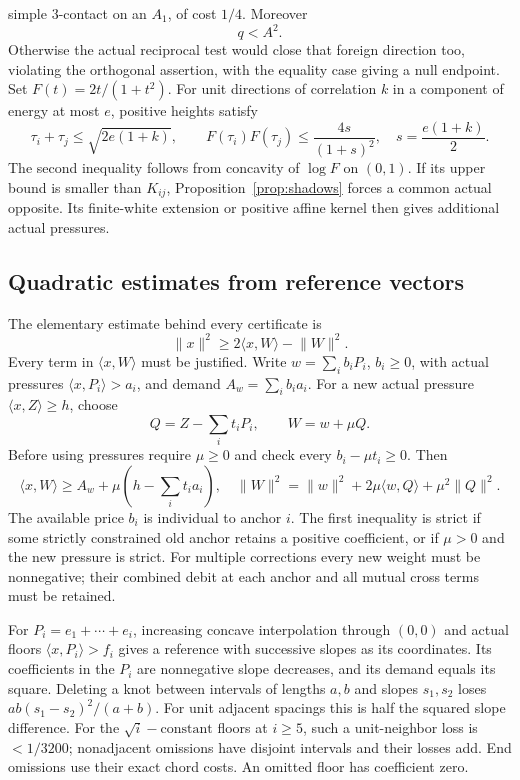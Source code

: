 \documentclass[11pt]{article}
\theoremstyle{remark}\newtheorem{remark}[theorem]{Remark}
\numberwithin{equation}{section}
\newcommand{\ip}[2]{\langle #1,#2\rangle}
\newcommand{\norm}[1]{\lVert #1\rVert}
\begin{document}
simple \(3\)-contact on an \(A_1\), of cost \(1/4\).
Moreover
 \begin{equation}\label{eq:foreigncost}q<A^2.
\end{equation}
Otherwise the actual reciprocal test would close that foreign
direction too, violating the orthogonal assertion, with the
equality case giving a null endpoint.
Set \(F(t)=2t/(1+t^2)\). For unit directions of correlation \(k\)
in a component of energy at most \(e\), positive heights satisfy
 \begin{equation}\label{eq:pairupper}\tau_i+\tau_j\leq\sqrt{2e(1+k)},\qquad
 F(\tau_i)F(\tau_j)\leq\frac{4s}{(1+s)^2},\quad
 s=\frac{e(1+k)}2.
\end{equation}
The second inequality follows from concavity of \(\log F\) on
 \((0,1)\). If its upper bound is smaller than \(K_{ij}\),
Proposition~\ref{prop:shadows} forces a common actual opposite.
Its finite-white extension or positive affine kernel then gives
additional actual pressures.

\subsection{Quadratic estimates from reference vectors}
\label{compact:sec:references}
The elementary estimate behind every certificate is
 \begin{equation}
\label{eq:square}\norm{x}^2\geq2\ip{x}{W}-\norm{W}^2.
\end{equation}
Every term in \(\ip{x}{W}\) must be justified.
Write \(w=\sum_i b_iP_i\), \(b_i\geq0\), with actual pressures
 \(\ip{x}{P_i}>a_i\), and demand \(A_w=\sum_i b_i a_i\).
For a new actual pressure \(\ip{x}{Z}\geq h\), choose
 \[
 Q=Z-\sum_i t_iP_i,\qquad W=w+\mu Q.
\]
Before using pressures require \(\mu\geq0\) and check every
 \(b_i-\mu t_i\geq0\).
Then
 \begin{equation}
\label{eq:payment}\ip{x}{W}\geq A_w+\mu(h-\sum_i t_i a_i),\quad
 \norm{W}^2=\norm{w}^2+2\mu\ip{w}{Q}+\mu^2\norm{Q}^2.
\end{equation}
The available price \(b_i\) is individual to anchor \(i\).
The first inequality is strict if some strictly constrained old
anchor retains a positive coefficient, or if \(\mu>0\) and the
new pressure is strict. For multiple corrections every new weight
must be nonnegative; their combined debit at each anchor and all
mutual cross terms must be retained.

For $P_i=e_1+\cdots+e_i$, increasing concave interpolation through
$(0,0)$ and actual floors $\ip x{P_i}>f_i$ gives a reference with
successive slopes as its coordinates. Its coefficients in the $P_i$ are nonnegative slope
decreases, and its demand equals its square. Deleting a knot between intervals of lengths $a,b$ and slopes
$s_1,s_2$ loses $ab(s_1-s_2)^2/(a+b)$. For unit adjacent
spacings this is half the squared slope difference. For the
$\sqrt i-\mathrm{constant}$ floors at $i\ge5$, such a unit-neighbor
loss is $<1/3200$; nonadjacent omissions have disjoint intervals
and their losses add. End omissions use their exact chord costs.
An omitted floor has coefficient zero.
\end{document}
